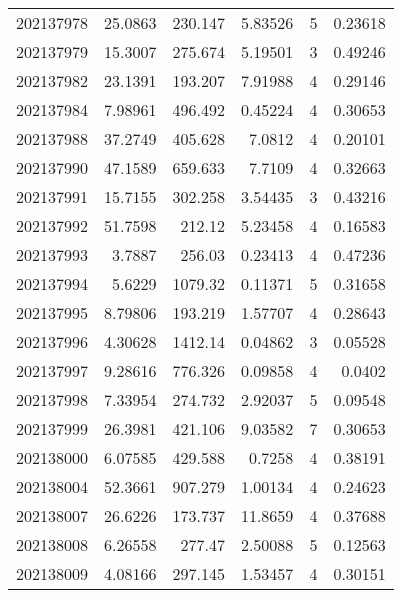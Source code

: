 \begin{tabular}{rrrrrr}
 202137978 &         25.0863  &      230.147  &            5.83526 &           5 & 0.23618 \\
 202137979 &         15.3007  &      275.674  &            5.19501 &           3 & 0.49246 \\
 202137982 &         23.1391  &      193.207  &            7.91988 &           4 & 0.29146 \\
 202137984 &          7.98961 &      496.492  &            0.45224 &           4 & 0.30653 \\
 202137988 &         37.2749  &      405.628  &            7.0812  &           4 & 0.20101 \\
 202137990 &         47.1589  &      659.633  &            7.7109  &           4 & 0.32663 \\
 202137991 &         15.7155  &      302.258  &            3.54435 &           3 & 0.43216 \\
 202137992 &         51.7598  &      212.12   &            5.23458 &           4 & 0.16583 \\
 202137993 &          3.7887  &      256.03   &            0.23413 &           4 & 0.47236 \\
 202137994 &          5.6229  &     1079.32   &            0.11371 &           5 & 0.31658 \\
 202137995 &          8.79806 &      193.219  &            1.57707 &           4 & 0.28643 \\
 202137996 &          4.30628 &     1412.14   &            0.04862 &           3 & 0.05528 \\
 202137997 &          9.28616 &      776.326  &            0.09858 &           4 & 0.0402  \\
 202137998 &          7.33954 &      274.732  &            2.92037 &           5 & 0.09548 \\
 202137999 &         26.3981  &      421.106  &            9.03582 &           7 & 0.30653 \\
 202138000 &          6.07585 &      429.588  &            0.7258  &           4 & 0.38191 \\
 202138004 &         52.3661  &      907.279  &            1.00134 &           4 & 0.24623 \\
 202138007 &         26.6226  &      173.737  &           11.8659  &           4 & 0.37688 \\
 202138008 &          6.26558 &      277.47   &            2.50088 &           5 & 0.12563 \\
 202138009 &          4.08166 &      297.145  &            1.53457 &           4 & 0.30151 \\

\end{tabular}

